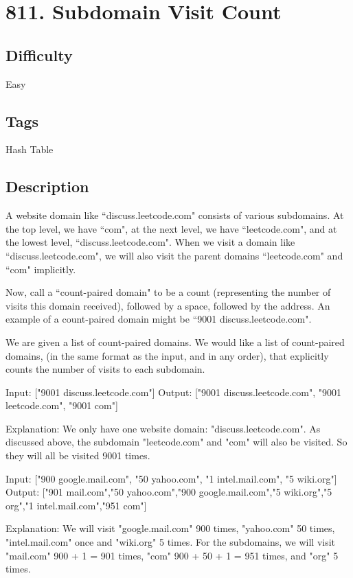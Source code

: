 \tocless\section{811. Subdomain Visit Count}
\label{algo:811}

\subsection*{Difficulty}
Easy

\subsection*{Tags}
Hash Table

\subsection*{Description}
A website domain like ``discuss.leetcode.com" consists of various subdomains. At the top level, we have ``com", at the next level, we have ``leetcode.com", and at the lowest level, ``discuss.leetcode.com". When we visit a domain like ``discuss.leetcode.com", we will also visit the parent domains ``leetcode.com" and ``com" implicitly.

Now, call a ``count-paired domain" to be a count (representing the number of visits this domain received), followed by a space, followed by the address. An example of a count-paired domain might be ``9001 discuss.leetcode.com".

We are given a list  of count-paired domains. We would like a list of count-paired domains, (in the same format as the input, and in any order), that explicitly counts the number of visits to each subdomain.
\begin{example}
\begin{multilinecode}
Input:
["9001 discuss.leetcode.com"]
Output:
["9001 discuss.leetcode.com", "9001 leetcode.com", "9001 com"]

Explanation:
We only have one website domain: "discuss.leetcode.com". As discussed above, the subdomain "leetcode.com" and "com" will also be visited. So they will all be visited 9001 times.
\end{multilinecode}
\end{example}

\begin{example}
\begin{multilinecode}
Input:
["900 google.mail.com", "50 yahoo.com", "1 intel.mail.com", "5 wiki.org"]
Output:
["901 mail.com","50 yahoo.com","900 google.mail.com","5 wiki.org","5 org","1 intel.mail.com","951 com"]

Explanation:
We will visit "google.mail.com" 900 times, "yahoo.com" 50 times, "intel.mail.com" once and "wiki.org" 5 times. For the subdomains, we will visit "mail.com" 900 + 1 = 901 times, "com" 900 + 50 + 1 = 951 times, and "org" 5 times.
\end{multilinecode}
\end{example}

